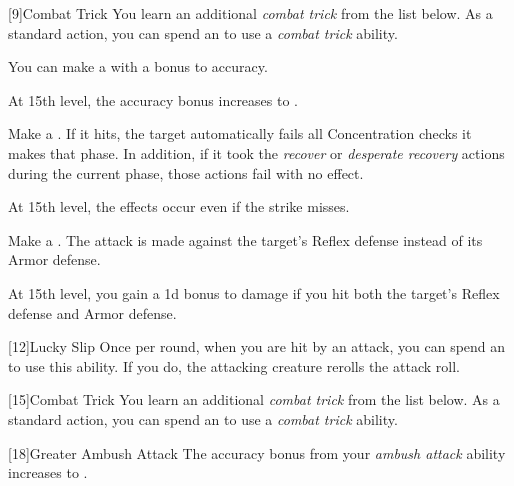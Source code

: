             [9]{Combat Trick}
            You learn an additional \textit{combat trick} from the list below.
            As a standard action, you can spend an  to use a \textit{combat trick} ability.
            {
                 You can make a  with a  bonus to accuracy.

                At 15th level, the accuracy bonus increases to .

                 Make a .
                If it hits, the target automatically fails all Concentration checks it makes that phase.
                In addition, if it took the \textit{recover} or \textit{desperate recovery} actions during the current phase, those actions fail with no effect.

                At 15th level, the effects occur even if the strike misses.

                 Make a .
                The attack is made against the target's Reflex defense instead of its Armor defense.

                At 15th level, you gain a \plus1d bonus to damage if you hit both the target's Reflex defense and Armor defense.
            }

            [12]{Lucky Slip}
            Once per round, when you are hit by an attack, you can spend an  to use this ability.
            If you do, the attacking creature rerolls the attack roll.

            [15]{Combat Trick}
            You learn an additional \textit{combat trick} from the list below.
            As a standard action, you can spend an  to use a \textit{combat trick} ability.
            {
            }

            [18]{Greater Ambush Attack}
            The accuracy bonus from your \textit{ambush attack} ability increases to .
